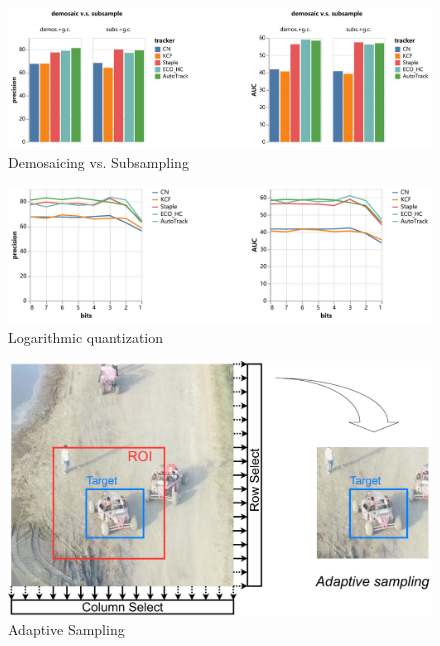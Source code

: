 \documentclass{beamer}
\begin{document}
\begin{frame}
    \begin{figure}[htpb]
        \begin{center}
            \includegraphics[width=0.8\linewidth]{fig/isp_dem_2.pdf}
            \caption{Demosaicing vs. Subsampling}
        \end{center}
    \end{figure}
\end{frame}

\begin{frame}
    \begin{figure}[htpb]
        \begin{center}
            \includegraphics[width=0.8\linewidth]{fig/bits.pdf}
            \caption{Logarithmic quantization}
        \end{center}
    \end{figure}
\end{frame}

\begin{frame}
    \begin{figure}[htpb]
        \begin{center}
            \includegraphics[width=0.7\linewidth]{fig/ad_s.pdf}
            \caption{Adaptive Sampling}
        \end{center}
    \end{figure}
\end{frame}
\end{document}
